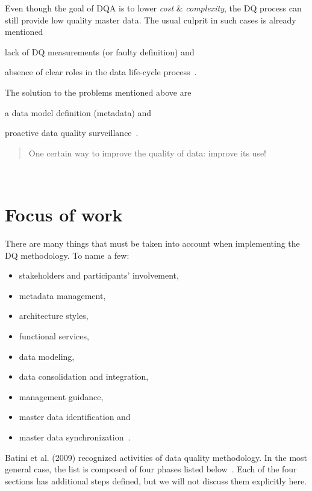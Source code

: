 Even though the goal of DQA is to lower \textit{cost} \& \textit{complexity}, the DQ process can still provide low quality master data.
The usual culprit in such cases is already mentioned
\begin{enumerate*}[label=(\roman*)]
    \item lack of DQ measurements (or faulty definition) and
    \item absence of clear roles in the data life-cycle process~\cite{haug2013}.
\end{enumerate*}

The solution to the problems mentioned above are
\begin{enumerate*}[label=(\roman*)]
    \item a data model definition (metadata) and
    \item proactive data quality surveillance~\cite{risto2011}.
\end{enumerate*}

\blockquote[][]{One certain way to improve the quality of data: improve its use!}~\cite{orr1998}

\section*{Focus of work}

There are many things that must be taken into account when implementing the DQ methodology.
To name a few:

\begin{itemize}
    \item stakeholders and participants' involvement,
    \item metadata management,
    \item architecture styles,
    \item functional services,
    \item data modeling,
    \item data consolidation and integration,
    \item management guidance,
    \item master data identification and
    \item master data synchronization~\cite{loshin2008}.
\end{itemize}

Batini et al. (2009) recognized activities of data quality methodology.
In the most general case, the list is composed of four phases listed below~\cite{batini2009}.
Each of the four sections has additional steps defined, but we will not discuss them explicitly here.


